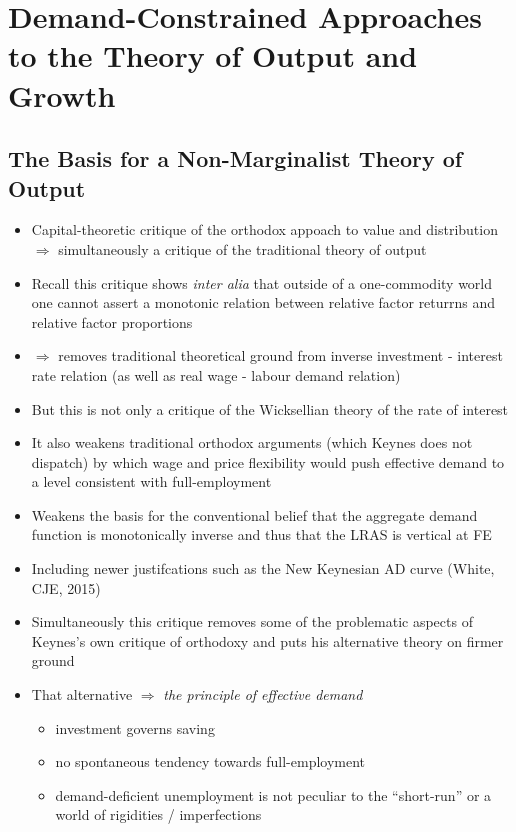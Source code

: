 \documentclass[a4paper,twoside]{article}
\numberwithin{equation}{section}
\numberwithin{figure}{section}
\begin{document}
\section{Demand-Constrained Approaches to the Theory of Output and Growth}
\subsection{The Basis for a Non-Marginalist Theory of Output}
	\begin{itemize}
		\item  Capital-theoretic critique of the orthodox appoach to value and distribution \( \Rightarrow \) simultaneously a critique of the traditional theory of output
		\item Recall this critique shows \textit{inter alia} that outside of a one-commodity world one cannot assert a monotonic relation between relative factor returrns and relative factor proportions
		\item \( \Rightarrow \) removes traditional theoretical ground from inverse investment - interest rate relation (as well as real wage - labour demand relation)
		\item But this is not only a critique of the Wicksellian theory of the rate of interest
		\item It also weakens traditional orthodox arguments (which Keynes does not dispatch) by which wage and price flexibility would push effective demand to a level consistent with full-employment
		\item Weakens the basis for the conventional belief that the aggregate demand function is monotonically inverse and thus that the LRAS is vertical at FE
		\item  Including newer justifcations such as the New Keynesian AD curve (White, CJE, 2015)
		\item Simultaneously this critique removes some of the problematic aspects of Keynes's own critique of orthodoxy and puts his alternative theory on firmer ground
		\item That alternative \( \Rightarrow \) \textit{the principle of effective demand}
		\begin{itemize}
			\item investment governs saving
			\item no spontaneous tendency towards full-employment
			\item demand-deficient unemployment is not peculiar to the ``short-run'' or a world of rigidities / imperfections
		\end{itemize}
	\end{itemize}
\end{document}

